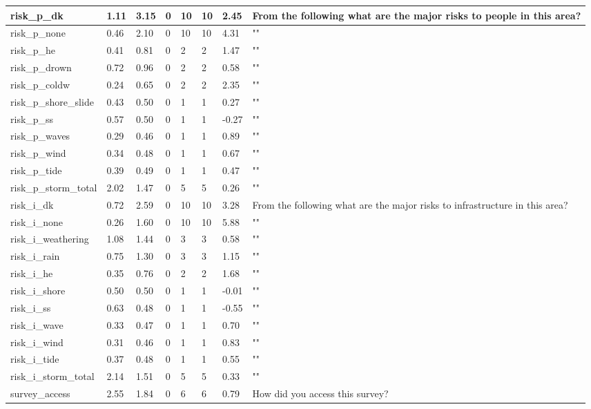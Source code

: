 \documentclass{article}
\begin{document}
\begin{center}
\begin{table}[!ht]
\begin{tabular}{|l|l|l|l|l|l|l|l|}
        risk\_p\_dk & 1.11 & 3.15 & 0 & 10 & 10 & 2.45 & From the following what are the major risks to people in this area? \\ \hline
        risk\_p\_none & 0.46 & 2.10 & 0 & 10 & 10 & 4.31 & "" \\ \hline
        risk\_p\_he & 0.41 & 0.81 & 0 & 2 & 2 & 1.47 & "" \\ \hline
        risk\_p\_drown & 0.72 & 0.96 & 0 & 2 & 2 & 0.58 & "" \\ \hline
        risk\_p\_coldw & 0.24 & 0.65 & 0 & 2 & 2 & 2.35 & "" \\ \hline
        risk\_p\_shore\_slide & 0.43 & 0.50 & 0 & 1 & 1 & 0.27 & "" \\ \hline
        risk\_p\_ss & 0.57 & 0.50 & 0 & 1 & 1 & -0.27 & "" \\ \hline
        risk\_p\_waves & 0.29 & 0.46 & 0 & 1 & 1 & 0.89 & "" \\ \hline
        risk\_p\_wind & 0.34 & 0.48 & 0 & 1 & 1 & 0.67 & "" \\ \hline
        risk\_p\_tide & 0.39 & 0.49 & 0 & 1 & 1 & 0.47 & "" \\ \hline
        risk\_p\_storm\_total & 2.02 & 1.47 & 0 & 5 & 5 & 0.26 & "" \\ \hline
        risk\_i\_dk & 0.72 & 2.59 & 0 & 10 & 10 & 3.28 & From the following what are the major risks to infrastructure in this area? \\ \hline
        risk\_i\_none & 0.26 & 1.60 & 0 & 10 & 10 & 5.88 & "" \\ \hline
        risk\_i\_weathering & 1.08 & 1.44 & 0 & 3 & 3 & 0.58 & "" \\ \hline
        risk\_i\_rain & 0.75 & 1.30 & 0 & 3 & 3 & 1.15 & "" \\ \hline
        risk\_i\_he & 0.35 & 0.76 & 0 & 2 & 2 & 1.68 & "" \\ \hline
        risk\_i\_shore & 0.50 & 0.50 & 0 & 1 & 1 & -0.01 & "" \\ \hline
        risk\_i\_ss & 0.63 & 0.48 & 0 & 1 & 1 & -0.55 & "" \\ \hline
        risk\_i\_wave & 0.33 & 0.47 & 0 & 1 & 1 & 0.70 & "" \\ \hline
        risk\_i\_wind & 0.31 & 0.46 & 0 & 1 & 1 & 0.83 & "" \\ \hline
        risk\_i\_tide & 0.37 & 0.48 & 0 & 1 & 1 & 0.55 & "" \\ \hline
        risk\_i\_storm\_total & 2.14 & 1.51 & 0 & 5 & 5 & 0.33 & "" \\ \hline
        survey\_access & 2.55 & 1.84 & 0 & 6 & 6 & 0.79 & How did you access this survey? \\ \hline

\end{tabular}
\end{table}
\end{center}
\end{document}
